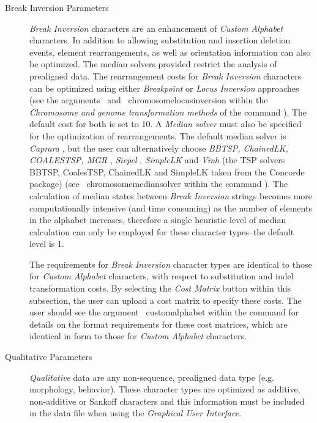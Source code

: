 \begin{description}
\item [Break Inversion Parameters] \emph{Break Inversion} characters
are an enhancement of \emph{Custom Alphabet} characters. In addition
to allowing substitution and insertion deletion events, element
rearrangements, as well as orientation information can also be
optimized.  The median solvers provided restrict the analysis of
prealigned data.  The rearrangement costs for \emph{Break Inversion}
characters can be optimized using either \emph{Breakpoint} or
\emph{Locus Inversion} approaches (see the
arguments~
and~ {chromosomelocusinversion} within
the \emph{Chromosome and genome transformation methods} of the
command ). The default cost for both is set
to 10. A \emph{Median solver} must also be specified for the
optimization of rearrangements. The default median solver is
\emph{Caprara} \cite{Caprara2001}, but the user can alternatively
choose \emph{BBTSP, ChainedLK, COALESTSP, MGR}
\cite{bourqueandpevzner2002}, \emph{Siepel} \cite{siepelmoret2001},
\emph{SimpleLK} and \emph{Vinh} (the TSP solvers BBTSP, CoalesTSP,
ChainedLK and SimpleLK taken from the Concorde package)
(see~ {chromosomemediansolver}  within the
command ).  The calculation of median states
between \emph {Break Inversion} strings becomes more computationally
intensive (and time consuming) as the number of elements in the
alphabet increases, therefore a single heuristic level of median
calculation can only be employed for these character types--the
default level is 1.

\indent The requirements for \emph{Break Inversion} character types
are identical to those for \emph{Custom Alphabet} characters, with
respect to substitution and indel transformation costs.  By selecting
the  \emph{Cost Matrix} button within this subsection, the user can
upload a cost matrix to specify these costs. The user should see
the argument~ {customalphabet} within the
command  for details on the format requirements
for these cost matrices, which are identical in form to those for
\emph{Custom Alphabet} characters.

\item [Qualitative Parameters] \emph{Qualitative} data are any
non-sequence, prealigned data type (e.g. morphology, behavior).
These character types are optimized as additive, non-additive or
Sankoff characters and this information must be included in the
data file when using the \emph{Graphical User Interface}.

\end{description}

